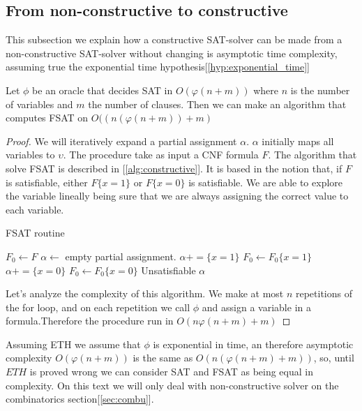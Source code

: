   \subsection{From non-constructive to constructive}
  \label{sub:fromnon}
  This subsection we explain how a constructive SAT-solver can be made from a non-constructive SAT-solver without changing is asymptotic time complexity, assuming true the exponential time hypothesis[\ref{hyp:exponential_time}]

  \begin{proposition}
    Let $\phi$ be an oracle that decides SAT in $O(\varphi(n+m))$ where $n$ is the number of variables and $m$ the number of clauses. Then we can make an algorithm  that computes FSAT on $O((n(\varphi(n+m))+m)$ 
  \end{proposition}
  \begin{proof}
    We will iteratively expand a partial assignment $\alpha$. $\alpha$ initially maps all variables to $\upsilon$. The procedure take as input a CNF formula $F$. The algorithm that solve FSAT is described in [\ref{alg:constructive}]. It is based in the notion that, if  $F$ is satisfiable, either $F\{x=1\}$ or $F\{x=0\}$ is satisfiable. We are able to explore the variable lineally being sure that we are always assigning the correct value to each variable. 

    
    \begin{algorithm}
  \caption{FSAT routine}\label{alg:constructive}
  \begin{algorithmic}[1]

    
  \State $F_0 \gets F$
  \State $\alpha \gets$ empty partial assignment.
  \State
    \State $\alpha += \{x = 1\}$
    \State $F_0 \gets F_0\{x=1\}$
    \Else {} 
    \State $\alpha += \{x = 0\}$
    \State $F_0 \gets F_0\{x=0\}$
    \Else
    \State \Retun Unsatisfiable
    \EndIf
    \EndIf
    \EndFor
    \State \Return $\alpha$
  \end{algorithmic}
\end{algorithm}

Let's analyze the complexity of this algorithm. We make at most $n$ repetitions of the for loop, and on each repetition we call $\phi$ and assign a variable in a formula.Therefore the procedure run in $O(n\varphi(n+m)+m)$
\end{proof}

Assuming ETH we assume that $\phi$ is exponential in time, an therefore asymptotic complexity $O(\varphi(n+m))$ is the same as $O(n(\varphi(n+m)+m))$, so, until $ETH$ is proved wrong we can consider SAT and FSAT as being equal in complexity. On this text we will only deal with non-constructive  solver on the combinatorics section[\ref{sec:combu}].



